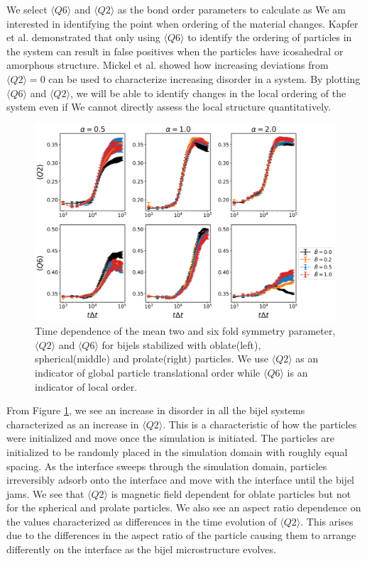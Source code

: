 We select $\langle Q6 \rangle$ and $\langle Q2 \rangle$ as the bond order parameters to calculate as We am interested in identifying the point when ordering 
of the material changes. Kapfer et al. demonstrated that only using $\langle Q6 \rangle$ to identify the ordering of particles in the system can result in 
false positives when the particles have icosahedral or amorphous structure. \cite{kapfer_jammed_2012} Mickel et al. showed how increasing deviations from 
$\langle Q2 \rangle = 0$ can be used to characterize increasing disorder in a system. \cite{mickel_shortcomings_2013} By plotting $\langle Q6 \rangle$ and 
$\langle Q2 \rangle$, we will be able to identify changes in the local ordering of the system even if We cannot directly assess the local structure quantitatively.

\begin{figure} 
    \centering 
    \includegraphics[width=\columnwidth]{figures/results/paper1/steinhardt_vs_coverage.png} 
    \caption{Time dependence of the mean two and six fold symmetry parameter, $\langle Q2 \rangle$ and $\langle Q6 \rangle$ 
    for bijels stabilized with oblate(left), spherical(middle) and prolate(right) particles. We use $\langle Q2 \rangle$ as an
    indicator of global particle translational order while $\langle Q6 \rangle$ is an indicator of local order.} 
    \label{fig:steinhardt_coverage} 
\end{figure}

From Figure \ref{fig:steinhardt_coverage}, we see an increase in disorder in all the bijel systems characterized as an increase in $\langle Q2 \rangle$. 
This is a characteristic of how the particles were initialized and move once the simulation is initiated. The particles are initialized to be randomly placed 
in the simulation domain with roughly equal spacing. As the interface sweeps through the simulation domain, particles irreversibly adsorb onto the interface 
and move with the interface until the bijel jams. We see that $\langle Q2 \rangle$ is magnetic field dependent for oblate particles but not for the spherical 
and prolate particles. We also see an aspect ratio dependence on the values characterized as differences in the time evolution of $\langle Q2 \rangle$. This 
arises due to the differences in the aspect ratio of the particle causing them to arrange differently on the interface as the bijel microstructure evolves.

